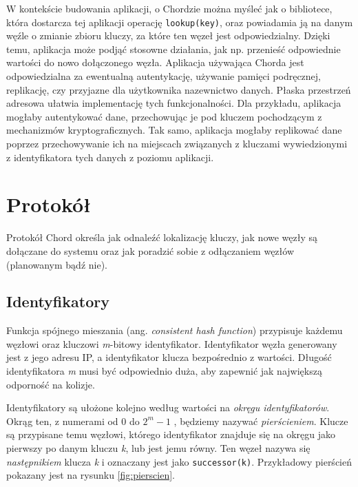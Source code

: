 \documentclass[12pt, twoside, openany]{report}
\begin{document}
W kontekście budowania aplikacji, o Chordzie można myśleć jak o bibliotece, która dostarcza tej aplikacji operację \texttt{lookup(key)}, oraz powiadamia ją na danym węźle o zmianie zbioru kluczy, za które ten węzeł jest odpowiedzialny. Dzięki temu, aplikacja może podjąć stosowne działania, jak np. przenieść odpowiednie wartości do nowo dołączonego węzła. Aplikacja używająca Chorda jest odpowiedzialna za ewentualną autentykację, używanie pamięci podręcznej, replikację, czy przyjazne dla użytkownika nazewnictwo danych. Płaska przestrzeń
adresowa ułatwia implementację tych funkcjonalności. Dla przykładu, aplikacja mogłaby autentykować dane, przechowując je pod kluczem pochodzącym z mechanizmów kryptograficznych. Tak samo, aplikacja mogłaby replikować dane poprzez przechowywanie ich na miejscach związanych z kluczami wywiedzionymi z identyfikatora tych danych z poziomu aplikacji.


\section{Protokół}

Protokół Chord określa jak odnaleźć lokalizację kluczy, jak nowe węzły są dołączane do systemu oraz jak poradzić sobie z odłączaniem węzłów (planowanym bądź nie).

\subsection{Identyfikatory}

Funkcja spójnego mieszania (ang. \textit{consistent hash function}) przypisuje każdemu węzłowi oraz kluczowi \textit{m}-bitowy identyfikator. Identyfikator węzła generowany jest z jego adresu IP, a identyfikator klucza bezpośrednio z wartości. Długość identyfikatora \textit{m} musi być odpowiednio duża, aby zapewnić jak największą odporność na kolizje.

Identyfikatory są ułożone kolejno według wartości na \textit{okręgu identyfikatorów}. Okrąg ten, z numerami od $0$ do  $2^m-1$ , będziemy nazywać \textit{pierścieniem}. Klucze są przypisane temu węzłowi, którego identyfikator znajduje się na okręgu jako pierwszy po danym kluczu \textit{k}, lub jest jemu równy. Ten węzeł nazywa się \textit{następnikiem} klucza \textit{k} i oznaczany jest jako \texttt{successor(k)}. Przykładowy pierścień pokazany jest na rysunku \ref{fig:pierscien}.
\end{document}
